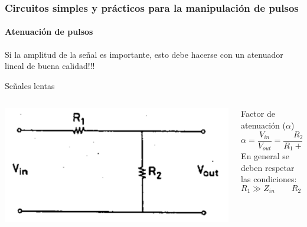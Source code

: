 \documentclass{beamer}
\begin{document}
\begin{frame}
\frametitle{Circuitos simples y prácticos para la manipulación de
pulsos}
\framesubtitle{{\color{blue}Atenuación de pulsos}}
\begin{alertblock}{}
Si la amplitud de la señal es importante, esto debe hacerse con un atenuador
lineal de buena calidad!!!
\end{alertblock}
\begin{block}{Señales lentas}
\begin{columns}
\begin{column}{0.5\textwidth}
\begin{center}
\includegraphics[width=\textwidth]{d2/att_for_slow_signal}
\end{center}
\end{column}
\begin{column}{0.5\textwidth}
Factor de atenuación ($\alpha$)
$$\alpha = \frac{V_{in}}{V_{out}} = \frac{R_2}{R_1 + R_2}$$
En general se deben respetar las condiciones:
$$R_1 \gg Z_{in} \qquad R_2 \ll Z_{out}$$
\end{column}
\end{columns}
\end{block}
\end{frame}
\end{document}
